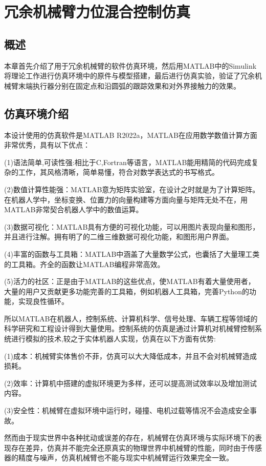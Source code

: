 \documentclass[12pt,a4paper,openany,oneside]{book}%
\numberwithin{equation}{chapter}%
\numberwithin{figure}{chapter}%
\begin{document}
\newpage
\chapter{冗余机械臂力位混合控制仿真}
\section{概述}
本章首先介绍了用于冗余机械臂的软件仿真环境，然后用MATLAB中的Simulink将理论工作进行仿真环境中的原件与模型搭建，最后进行仿真实验，验证了冗余机械臂末端执行器分别在固定点和沿圆弧的跟踪效果和对外界接触力的效果。
\section{仿真环境介绍}
本设计使用的仿真软件是MATLAB R2022a，MATLAB在应用数学数值计算方面非常优秀，具有以下优点：\par
(1)语法简单,可读性强:相比于C,Fortran等语言，MATLAB能用精简的代码完成复杂的工作，其风格清晰，简单易懂，符合对数学表达式的书写格式。

(2)数值计算性能强：MATLAB意为矩阵实验室，在设计之时就是为了计算矩阵。在机器人学中，坐标变换、位置力的向量构建等方面向量与矩阵无处不在，用MATLAB非常契合机器人学中的数值运算。\par
(3)数据可视化：MATLAB具有方便的可视化功能，可以用图片表现向量和图形，并且进行注解。拥有明了的二维三维数据可视化功能，和图形用户界面。\par
(4)丰富的函数与工具箱：MATLAB中涵盖了大量数学公式，也囊括了大量理工类的工具箱。齐全的函数让MATLAB编程非常高效。\par
(5)活力的社区：正是由于MATLAB的这些优点，使MATLAB有着大量使用者，大量的用户又贡献更多功能完善的工具箱，例如机器人工具箱，完善Python的功能，实现良性循环。\par
所以MATLAB在机器人，控制系统、计算机科学、信号处理、车辆工程等领域的科学研究和工程设计得到大量使用。控制系统的仿真是通过计算机对机械臂控制系统进行模拟的技术,较之于实体机器人实现，仿真在以下方面有优势:\par
(1)成本：机械臂实体售价不菲，仿真可以大大降低成本，并且不会对机械臂造成损耗。\par
(2)效率：计算机中搭建的虚拟环境更为多样，还可以提高测试效率以及增加测试内容。\par
(3)安全性：机械臂在虚拟环境中运行时，碰撞、电机过载等情况不会造成安全事故。\par
然而由于现实世界中各种扰动或误差的存在，机械臂在仿真环境与实际环境下的表现存在差异，仿真并不能完全还原真实的物理世界中机械臂的性能，同时由于传感器的精度与噪声，仿真机械臂也不能与现实中机械臂运行效果完全一致。
\end{document}
